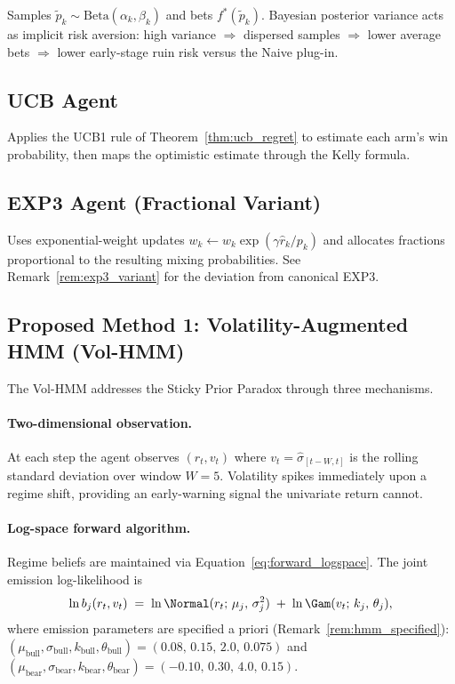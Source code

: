 Samples $\tilde p_k \sim \mathrm{Beta}(\alpha_k,\beta_k)$ and bets
$f^*(\tilde p_k)$.  Bayesian posterior variance acts as implicit risk aversion:
high variance $\Rightarrow$ dispersed samples $\Rightarrow$ lower average bets
$\Rightarrow$ lower early-stage ruin risk versus the Naive plug-in.

\subsection{UCB Agent}

Applies the UCB1 rule of Theorem~\ref{thm:ucb_regret} to estimate each arm's
win probability, then maps the optimistic estimate through the Kelly formula.

\subsection{EXP3 Agent (Fractional Variant)}

Uses exponential-weight updates $w_k \leftarrow w_k\exp(\gamma\hat r_k/p_k)$
and allocates fractions proportional to the resulting mixing probabilities.
See Remark~\ref{rem:exp3_variant} for the deviation from canonical EXP3.

\subsection{Proposed Method 1: Volatility-Augmented HMM (Vol-HMM)}
\label{sec:vol_hmm}

The Vol-HMM addresses the Sticky Prior Paradox through three mechanisms.

\paragraph{Two-dimensional observation.}
At each step the agent observes $(r_t,v_t)$ where
$v_t = \hat\sigma_{[t-W,t]}$ is the rolling standard deviation over window
$W=5$.  Volatility spikes immediately upon a regime shift, providing an
early-warning signal the univariate return cannot.

\paragraph{Log-space forward algorithm.}
Regime beliefs are maintained via Equation~\eqref{eq:forward_logspace}.  The
joint emission log-likelihood is
\begin{equation}
    \ln b_j(r_t,v_t) \;=\;
    \ln\Normal(r_t;\,\mu_j,\,\sigma_j^2)
    \;+\;
    \ln\Gam(v_t;\,k_j,\,\theta_j),
    \label{eq:vol_hmm_emission}
\end{equation}
where emission parameters are specified a priori
(Remark~\ref{rem:hmm_specified}):
$(\mu_{\text{bull}},\sigma_{\text{bull}},k_{\text{bull}},\theta_{\text{bull}})
 = (0.08,\,0.15,\,2.0,\,0.075)$ and
$(\mu_{\text{bear}},\sigma_{\text{bear}},k_{\text{bear}},\theta_{\text{bear}})
 = (-0.10,\,0.30,\,4.0,\,0.15)$.


